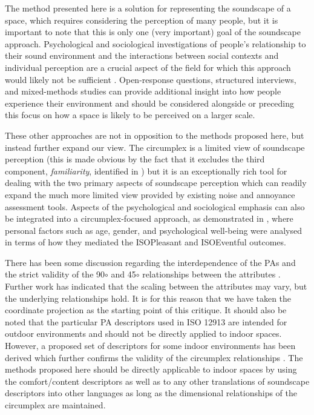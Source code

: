 \documentclass[
  authoryear,
  preprint,
  3p]{elsarticle}
\begin{document}
The method presented here is a solution for representing the soundscape
of a space, which requires considering the perception of many people,
but it is important to note that this is only one (very important) goal
of the soundscape approach. Psychological and sociological
investigations of people's relationship to their sound environment and
the interactions between social contexts and individual perception are a
crucial aspect of the field for which this approach would likely not be
sufficient \citep{Bild2018Public}. Open-response questions, structured
interviews, and mixed-methods studies can provide additional insight
into how people experience their environment and should be considered
alongside or preceding this focus on how a space is likely to be
perceived on a larger scale.

These other approaches are not in opposition to the methods proposed
here, but instead further expand our view. The circumplex is a limited
view of soundscape perception (this is made obvious by the fact that it
excludes the third component, \emph{familiarity}, identified in
\citet{Axelsson2010Principal}) but it is an exceptionally rich tool for
dealing with the two primary aspects of soundscape perception which can
readily expand the much more limited view provided by existing noise and
annoyance assessment tools. Aspects of the psychological and
sociological emphasis can also be integrated into a circumplex-focused
approach, as demonstrated in \citet{Erfanian2021Psychological}, where
personal factors such as age, gender, and psychological well-being were
analysed in terms of how they mediated the ISOPleasant and ISOEventful
outcomes.

There has been some discussion regarding the interdependence of the PAs
and the strict validity of the 90\(\circ\) and 45\(\circ\) relationships
between the attributes \citep{Lionello2021Introducing}. Further work has
indicated that the scaling between the attributes may vary, but the
underlying relationships hold. It is for this reason that we have taken
the coordinate projection as the starting point of this critique. It
should also be noted that the particular PA descriptors used in ISO
12913 are intended for outdoor environments and should not be directly
applied to indoor spaces. However, a proposed set of descriptors for
some indoor environments has been derived which further confirms the
validity of the circumplex relationships \citep{Torresin2020Indoor}. The
methods proposed here should be directly applicable to indoor spaces by
using the comfort/content descriptors as well as to any other
translations of soundscape descriptors into other languages
\citep{Aletta2020Soundscape} as long as the dimensional relationships of
the circumplex are maintained.
\end{document}
